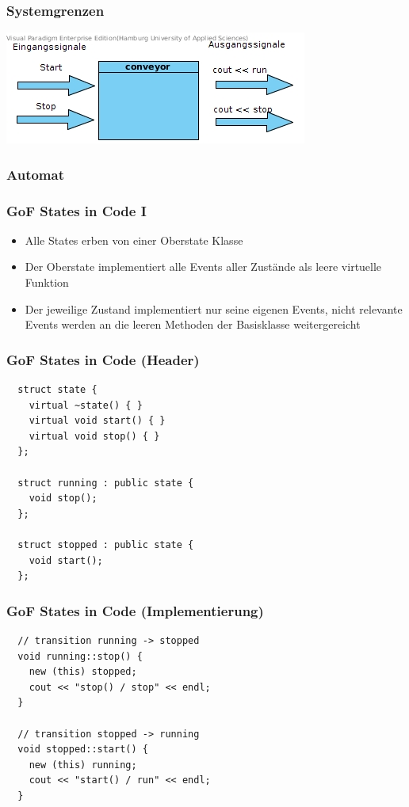 \documentclass{beamer}
\begin{document}
\begin{frame}
 \frametitle{Systemgrenzen}
 \includegraphics[scale=.7]{img/Systemgrenzen_fsm_gof.jpg}
\end{frame}

\begin{frame}
 \frametitle{Automat}
\end{frame}

\begin{frame}
 \frametitle{GoF States in Code I}
 \begin{itemize}
  \item Alle States erben von einer Oberstate Klasse
  \item Der Oberstate implementiert alle Events aller Zust\"ande als leere virtuelle Funktion
  \item Der jeweilige Zustand implementiert nur seine eigenen Events, nicht relevante
  Events werden an die leeren Methoden der Basisklasse weitergereicht
 \end{itemize}
\end{frame}

\begin{frame}[fragile]
 \frametitle{GoF States in Code (Header)}
 \begin{lstlisting}
  struct state {
    virtual ~state() { }
    virtual void start() { }
    virtual void stop() { }
  };

  struct running : public state {
    void stop();
  };

  struct stopped : public state {
    void start();
  };
 \end{lstlisting}
\end{frame}

\begin{frame}[fragile]
 \frametitle{GoF States in Code (Implementierung)}
 \begin{lstlisting}
  // transition running -> stopped
  void running::stop() {
    new (this) stopped;
    cout << "stop() / stop" << endl;
  }

  // transition stopped -> running
  void stopped::start() {
    new (this) running;
    cout << "start() / run" << endl;
  }
 \end{lstlisting}
\end{frame}
\end{document}
